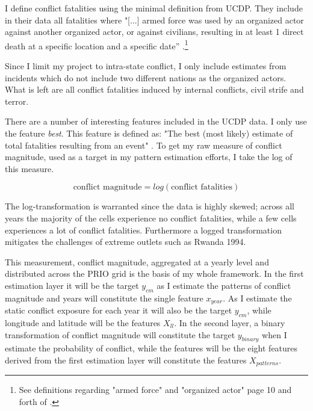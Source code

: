 \documentclass[a4paper]{article}
\begin{document}
I define conflict fatalities using the minimal definition from UCDP. They include in their data all fatalities where "[...] armed force was used by an organized actor against another organized actor, or against civilians, resulting in at least 1 direct death at a specific location and a specific date” \cite[9]{Croicu_Sundberg_2017}.\footnote{See definitions regarding "armed force" and "organized actor" page 10 and forth of \cite{Croicu_Sundberg_2017}.}\par 

Since I limit my project to intra-state conflict, I only include estimates from incidents which do not include two different nations as the organized actors. What is left are all conflict fatalities induced by internal conflicts, civil strife and terror.\par

There are a number of interesting features included in the UCDP data. I only use the feature \emph{best}. This feature is defined as: "The best (most likely) estimate of total fatalities resulting from an event" \cite[7]{Croicu_Sundberg_2017}. To get my raw measure of conflict magnitude, used as a target in my pattern estimation efforts, I take the log of this measure.\par

\[
\text{conflict magnitude} = log(\text{conflict fatalities}) \tag{18} \label{eq:cm}
\]

The log-transformation is warranted since the data is highly skewed; across all years the majority of the cells experience no conflict fatalities, while a few cells experiences a lot of conflict fatalities. Furthermore a logged transformation mitigates the challenges of extreme outlets such as Rwanda 1994.\par

This measurement, conflict magnitude, aggregated at a yearly level and distributed across the PRIO grid is the basis of my whole framework. In the first estimation layer it will be the target $y_{cm}$ as I estimate the patterns of conflict magnitude and years will constitute the single feature $x_{year}$. As I estimate the static conflict exposure for each year it will also be the target $y_{cm}$, while longitude and latitude will be the features $X_{ll}$. In the second layer, a binary transformation of conflict magnitude will constitute the target $y_{binary}$ when I estimate the probability of conflict, while the features will be the eight features derived from the first estimation layer will constitute the features $X_{patterns}$.\par
\end{document}

